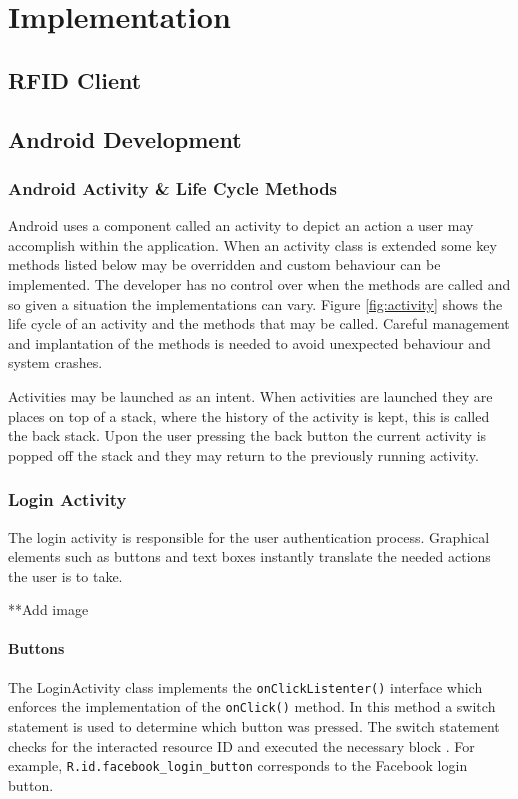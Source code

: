 \documentclass[a4paper, 11pt]{article}
\begin{document}
\section{Implementation}

\subsection{RFID Client}%


\subsection{Android Development} 

\subsubsection{Android Activity \& Life Cycle Methods}
Android uses a component called an activity to depict an action a user may accomplish within the application. When an activity class is extended some key methods listed below may be overridden and custom behaviour can be implemented. The developer has no control over when the methods are called and so given a situation the implementations can vary. Figure \ref{fig:activity} shows the life cycle of an activity and the methods that may be called. Careful management and implantation of the methods is needed to avoid unexpected behaviour and system crashes.

Activities may be launched as an intent. When activities are launched they are places on top of a stack, where the history of the activity is kept, this is called the back stack. Upon the user pressing the back button the current activity is popped off the stack and they may return to the previously running activity. 


\subsubsection{Login Activity}
The login activity is responsible for the user authentication process. Graphical elements such as buttons and text boxes instantly translate the needed actions the user is to take. 

**Add image

\paragraph{Buttons}
The LoginActivity class implements the \texttt{onClickListenter()} interface which enforces the implementation of the \texttt{onClick()} method. In this method a switch statement is used to determine which button was pressed. The switch statement checks for the interacted resource ID and executed the necessary block . For example, \texttt{R.id.facebook\_login\_button} corresponds to the Facebook login button. 
\end{document}
